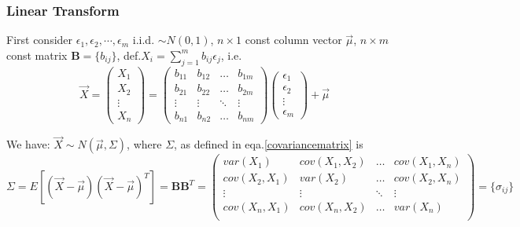 \subsubsection{Linear Transform}
    First consider $\epsilon_1,\epsilon_2,\cdots,\epsilon_m$ i.i.d. $\sim N(0,1)$, $n\times 1$ const column vector $\vec{\mu}$, $n\times m$ const matrix $\mathbf{B}=\{b_{ij}\}$, def.$X_i={\displaystyle\sum_{j=1}^m b_{ij}\epsilon_j}$, i.e.
    \[
        \vec{X}=
        \begin{pmatrix}
            X_1\\X_2\\ \vdots\\X_n
        \end{pmatrix}
        =
        \begin{pmatrix}
            b_{11}&b_{12}&\ldots&b_{1m}\\
            b_{21}&b_{22}&\ldots&b_{2m}\\
            \vdots&\vdots&\ddots&\vdots\\
            b_{n1}&b_{n2}&\ldots&b_{nm}
        \end{pmatrix}
        \begin{pmatrix}
            \epsilon_1\\
            \epsilon_2\\
            \vdots\\
            \epsilon_m
        \end{pmatrix}
        +\vec{\mu}
    \]

    
    We have: $\vec{X}\sim N(\vec{\mu},\Sigma)$, where $\Sigma$, as defined in eqa.\ref{covariancematrix} is
    \[
        \Sigma=E[(\vec{X}-\vec{\mu})(\vec{X}-\vec{\mu})^T]=\mathbf{BB}^T=
        \begin{pmatrix}
        var(X_1) & cov(X_1,X_2) & \ldots & cov(X_1,X_n)\\
        cov(X_2,X_1) & var(X_2) & \ldots & cov(X_2,X_n)\\
        \vdots & \vdots & \ddots & \vdots\\
        cov(X_n,X_1) & cov(X_n,X_2) & \ldots & var(X_n)\\
        \end{pmatrix}  
        =\{\sigma_{ij}\}  
    \]

